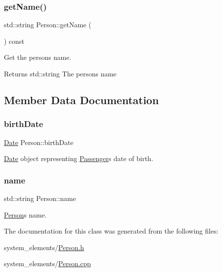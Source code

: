 \subsubsection{\texorpdfstring{get\+Name()}{getName()}}
{\footnotesize\ttfamily std\+::string Person\+::get\+Name (\begin{DoxyParamCaption}{ }\end{DoxyParamCaption}) const}



Get the person\textquotesingle{}s name. 

\begin{DoxyReturn}{Returns}
std\+::string The person\textquotesingle{}s name 
\end{DoxyReturn}


\subsection{Member Data Documentation}
\mbox{\label{classPerson_a7a764b56b815321eeb8412c1dcc4cabf}} 
\subsubsection{\texorpdfstring{birth\+Date}{birthDate}}
{\footnotesize\ttfamily \mbox{\hyperlink{classDate}{Date}} Person\+::birth\+Date\hspace{0.3cm}{\ttfamily [protected]}}



\mbox{\hyperlink{classDate}{Date}} object representing \mbox{\hyperlink{classPassenger}{Passenger}}\textquotesingle{}s date of birth. 

\mbox{\label{classPerson_a7594663aadc0de77616506df8a2f4128}} 
\subsubsection{\texorpdfstring{name}{name}}
{\footnotesize\ttfamily std\+::string Person\+::name\hspace{0.3cm}{\ttfamily [protected]}}



\mbox{\hyperlink{classPerson}{Person}}\textquotesingle{}s name. 



The documentation for this class was generated from the following files\+:\begin{DoxyCompactItemize}
\item 
system\+\_\+elements/\mbox{\hyperlink{Person_8h}{Person.\+h}}\item 
system\+\_\+elements/\mbox{\hyperlink{Person_8cpp}{Person.\+cpp}}\end{DoxyCompactItemize}
